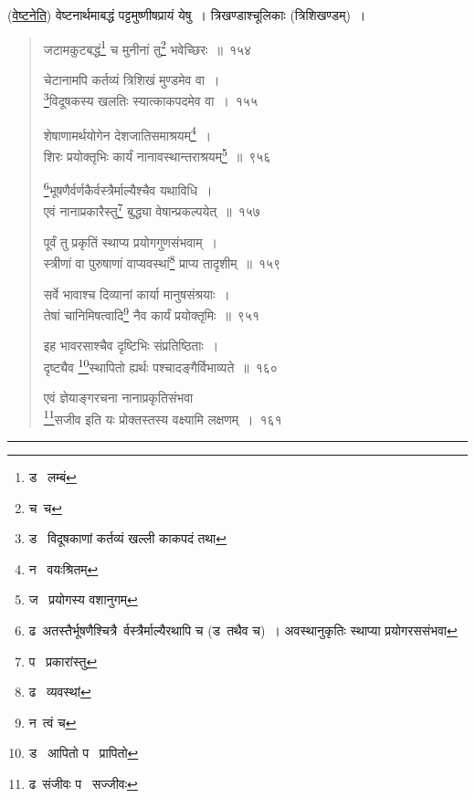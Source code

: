 \documentclass[11pt, openany]{book}
\begin{document}
\vspace{2mm}
(\underline{वेष्टनेति}) वेष्टनार्थमाबद्धं पट्टमुष्णीषप्रायं येषु~। त्रिखण्डाश्चूलिकाः (त्रिशिखण्डम्)~।

\newpage

\begin{quote}
{\na जटामकुटबद्धं\renewcommand{\thefootnote}{1}\footnote{ड \textendash\ लम्बं} च मुनीनां तु\renewcommand{\thefootnote}{2}\footnote{च\textendash\ च} भवेच्छिरः~॥~१५४

चेटानामपि कर्तव्यं त्रिशिखं मुण्डमेव वा~।\\
\renewcommand{\thefootnote}{3}\footnote{ड \textendash\ विदूषकाणां कर्तव्यं खल्ली काकपदं तथा}विदूषकस्य खलतिः स्यात्काकपदमेव वा~।~१५५

शेषाणामर्थयोगेन देशजातिसमाश्रयम्\renewcommand{\thefootnote}{4}\footnote{न \textendash\ वयःश्रितम्}~।\\
शिरः प्रयोक्तृभिः कार्यं नानावस्थान्तराश्रयम्\renewcommand{\thefootnote}{5}\footnote{ज \textendash\ प्रयोगस्य वशानुगम्}~॥~९५६

\renewcommand{\thefootnote}{6}\footnote{ढ\textendash\ अतस्तैर्भूषणैश्चित्रै\textendash\ र्वस्त्रैर्माल्यैरथापि च (ड\textendash\ तथैव च)~। अवस्थानुकृतिः स्थाप्या प्रयोगरससंभवा}भूषणैर्वर्णकैर्वस्त्रैर्माल्यैश्चैव यथाविधि~।\\
एवं नानाप्रकारैस्तु\renewcommand{\thefootnote}{7}\footnote{प \textendash\ प्रकारांस्तु} बुद्ध्या वेषान्प्रकल्पयेत्~॥~१५७

पूर्वं तु प्रकृतिं स्थाप्य प्रयोगगुणसंभवाम्~।\\
स्त्रीणां वा पुरुषाणां वाप्यवस्थां\renewcommand{\thefootnote}{8}\footnote{ढ \textendash\ व्यवस्थां} प्राप्य तादृशीम्~॥~१५९

सर्वे भावाश्च दिव्यानां कार्या मानुषसंश्रयाः~।\\
तेषां चानिमिषत्वादि\renewcommand{\thefootnote}{9}\footnote{न\textendash\ त्वं च} नैव कार्यं प्रयोक्तृमिः~॥~९५१

इह भावरसाश्चैव दृष्टिभिः संप्रतिष्ठिताः~।\\
दृष्ट्यैव \renewcommand{\thefootnote}{10}\footnote{ड \textendash\ आपितो प \textendash\ प्रापितो}स्थापितो ह्यर्थः पश्चादङ्गैर्विभाव्यते~॥~१६०

एवं ज्ञेयाङ्गरचना नानाप्रकृतिसंभवा \\
\renewcommand{\thefootnote}{11}\footnote{ढ\textendash\ संजीवः प \textendash\ सज्जीवः}सजीव इति यः प्रोक्तस्तस्य वक्ष्यामि लक्षणम्~।~१६१}
\end{quote}

\hrule
\end{document}
